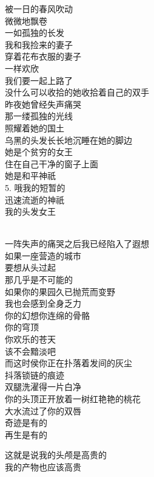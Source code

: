 \documentclass{article}
\begin{document}
被一日的春风吹动\\
微微地飘卷
\\
一如孤独的长发 \\ 


我和我捡来的妻子\\
穿着花布衣服的妻子\\
一样欢欣\\
我们要一起上路了\\
没什么可以收拾的她收拾着自己的双手
\\
昨夜她曾经失声痛哭 \\ 


那一缕孤独的光线\\
照耀着她的国土\\
乌黑的头发长长地沉睡在她的脚边\\
她是个贫穷的女王\\
住在自己干净的窗子上面
\\
她是和平神祇 \\ 


5. 哦我的短暂的\\
迅速流逝的神祇\\
我的头发女王
\newpage

\\
一阵失声的痛哭之后我已经陷入了遐想 \\ 


如果一座营造的城市\\
要想从头过起\\
那几乎是不可能的\\
如果你的果园久已抛荒而变野\\
我也会感到全身乏力\\
你的幻想你连绵的骨骼\\
你的穹顶\\
你欢乐的苍天
\\
该不会黯淡吧 \\ 


而这时侯你正在扑落着发间的灰尘\\
抖落锁链的痕迹\\
双腿洗濯得一片白净
\\
你的头顶正开放着一树红艳艳的桃花 \\ 


大水流过了你的双唇 \\ 


奇迹是有的\\
再生是有的\\
\newpage

这就是说我的头颅是高贵的
\\
我的产物也应该高贵 \\ 
\end{document}
